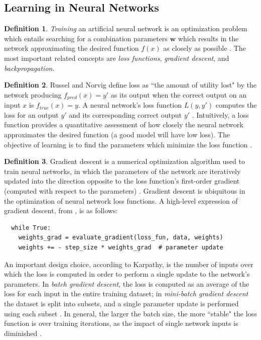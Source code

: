 \documentclass[12pt, titlepage]{report}
\theoremstyle{definition}
\newtheorem{definition}{Definition}
\begin{document}
\subsection{Learning in Neural Networks}
\begin{definition}
\emph{Training} an artificial neural network is an optimization problem which entails searching for a combination parameters $\bm{w}$ which results in the network approximating the desired function $f(x)$ as closely as possible \cite[p. 718]{russel2009artificial}. The most important related concepts are \emph{loss functions}, \emph{gradient descent}, and \emph{backpropagation}.
\end{definition}

\begin{definition}
Russel and Norvig define loss as ``the amount of utility lost" by the network producing $f_{pred}(x) = y'$ as its output when the correct output on an input $x$ is $f_{true}(x) = y$. A neural network's loss function $L(y, y')$ computes the loss for an output $y'$ and its corresponding correct output $y'$ \cite{russel2009artificial}. Intuitively, a loss function provides a quantitative assessment of how closely the neural network approximates the desired function (a good model will have low loss). The objective of learning is to find the parameters which minimize the loss function \cite[Linear classification: Support Vector Machine, Softmax]{karpathy2017cs231n}.
\end{definition}

\begin{definition}
Gradient descent is a numerical optimization algorithm used to train neural networks, in which the parameters of the network are iteratively updated into the direction opposite to the loss function's first-order gradient (computed with respect to the parameters) \cite[Optimization: Stochastic Gradient Descent]{karpathy2017cs231n}. Gradient descent is ubiquitous in the optimization of neural network loss functions. A high-level expression of gradient descent, from \cite{karpathy2017cs231n}, is as follows:

\begin{verbatim}
  while True:
    weights_grad = evaluate_gradient(loss_fun, data, weights)
    weights += - step_size * weights_grad  # parameter update
\end{verbatim}
\end{definition}

An important design choice, according to Karpathy, is the number of inputs over which the loss is computed in order to perform a single update to the network's parameters. In \emph{batch gradient descent}, the loss is computed as an average of the loss for each input in the entire training dataset; in \emph{mini-batch gradient descent} the dataset is split into subsets, and a single parameter update is performed using each subset \cite[Optimization: Stochastic Gradient Descent]{karpathy2017cs231n}. In general, the larger the batch size, the more ``stable" the loss function is over training iterations, as the impact of single network inputs is diminished \cite[Neural Networks Part 3: Learning and Evaluation]{karpathy2017cs231n}. 
\end{document}
